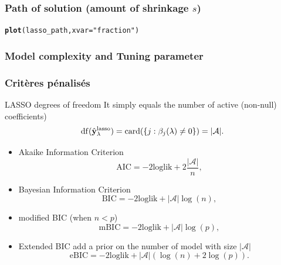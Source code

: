 \documentclass[10pt, c, xcolor=x11names]{beamer}\usepackage[]{graphicx}\usepackage[]{color}
\makeatletter
\newcommand{\hlstr}[1]{\textcolor[rgb]{0.192,0.494,0.8}{#1}}%
\newcommand{\hlstd}[1]{\textcolor[rgb]{0.345,0.345,0.345}{#1}}%
\newcommand{\hlkwc}[1]{\textcolor[rgb]{0.333,0.667,0.333}{#1}}%
\newcommand{\hlkwd}[1]{\textcolor[rgb]{0.737,0.353,0.396}{\textbf{#1}}}%
\newenvironment{kframe}{%
 \def\at@end@of@kframe{}%
 \ifinner\ifhmode%
  \def\at@end@of@kframe{\end{minipage}}%
  \begin{minipage}{\columnwidth}%
 \fi\fi%
 \def\FrameCommand##1{\hskip\@totalleftmargin \hskip-\fboxsep
 \colorbox{shadecolor}{##1}\hskip-\fboxsep
     \hskip-\linewidth \hskip-\@totalleftmargin \hskip\columnwidth}%
 \MakeFramed {\advance\hsize-\width
   \@totalleftmargin\z@ \linewidth\hsize
   \@setminipage}}%
 {\par\unskip\endMakeFramed%
 \at@end@of@kframe}
\newenvironment{knitrout}{}{} %
\makeatother
\begin{document}
\begin{frame}[containsverbatim]
  \frametitle{Path of solution (amount of shrinkage $s$)}

\begin{knitrout}\scriptsize
{}\color{fgcolor}\begin{kframe}
\begin{alltt}
\hlkwd{plot}\hlstd{(lasso_path,} \hlkwc{xvar}\hlstd{=}\hlstr{"fraction"}\hlstd{)}
\end{alltt}


{\ttfamily\noindent\bfseries{}}\end{kframe}
\end{knitrout}
\end{frame}

\subsubsection{Model complexity and Tuning parameter}

\begin{frame}
  \frametitle{Critères pénalisés}

  \begin{block}{LASSO degrees of freedom}
    It simply equals the number of active (non-null) coefficients)
\[
\mathrm{df}(\hat{\mathbf{y}}_\lambda^{\text{lasso}}) = \mathrm{card}(\left\{j:\beta_j(\lambda)\neq 0\right\}) = |\mathcal{A}|.
\]
  \end{block}

  \begin{itemize}
    \item \alert{Akaike Information Criterion} 
        \begin{equation*}
          \mathrm{AIC} = -2 \mathrm{loglik} + 2\frac{|\mathcal{A}|}{n},
        \end{equation*}
      \item \alert{Bayesian   Information   Criterion}
        \begin{equation*}
          \mathrm{BIC} = -2\mathrm{loglik} + |\mathcal{A}|\log(n),
        \end{equation*}
      \item \alert{modified BIC} (when $n < p$)
        \begin{equation*}
          \mathrm{mBIC} = -2\mathrm{loglik} + |\mathcal{A}|\log(p),
        \end{equation*}
      \item \alert{Extended BIC} add a prior on the number of model with size  $|\mathcal{A}|$
        \begin{equation*}
          \mathrm{eBIC} = -2\mathrm{loglik} + |\mathcal{A}|(\log(n) + 2\log(p)).
        \end{equation*}
      \end{itemize}
\end{frame}
\end{document}
